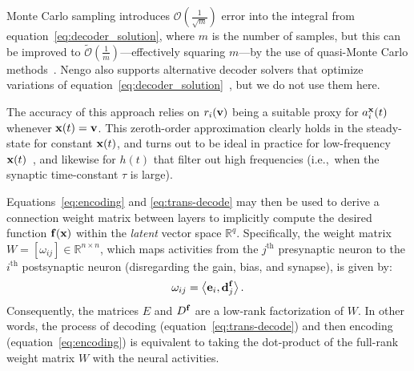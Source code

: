 Monte Carlo sampling introduces $\mathcal{O} \left( \frac{1}{\sqrt{m}} \right)$ error into the integral from equation~\ref{eq:decoder_solution}, where $m$ is the number of samples, but this can be improved to $\widetilde{\mathcal{O}} \left( \frac{1}{m} \right)$---effectively squaring $m$---by the use of quasi-Monte Carlo methods~\citep{fang1994, voelker2016b}.
Nengo also supports alternative decoder solvers that optimize variations of equation~\ref{eq:decoder_solution}~\citep[e.g.,][]{voelker2016a, abrams2017}, but we do not use them here.


The accuracy of this approach relies on $r_i(\mathbf{v})$ being a suitable proxy for $a_i^{\mathbf{x}}(t)$ whenever $\mathbf{x}(t) = \mathbf{v}$.
This zeroth-order approximation clearly holds in the steady-state for constant $\mathbf{x}(t)$, and turns out to be ideal in practice for low-frequency $\mathbf{x}(t)$~\citep[][appendix~F.1]{eliasmith2003neural}, and likewise for $h(t)$ that filter out high frequencies (i.e.,~when the synaptic time-constant $\tau$ is large).

Equations~\ref{eq:encoding} and \ref{eq:trans-decode} may then be used to derive a connection weight matrix between layers to implicitly compute the desired function $\mathbf{f}(\mathbf{x})$ within the \emph{latent} vector space $\mathbb{R}^q$.
Specifically, the weight matrix $W = [\omega_{ij}] \in \mathbb{R}^{n \times n}$, which maps activities from the $j^{\text{th}}$ presynaptic neuron to the $i^{\text{th}}$ postsynaptic neuron (disregarding the gain, bias, and synapse), is given by:
\begin{equation} \label{eq:factored-weights}
\omega_{ij} = \left\langle \V{e}_i, \V{d}^\V{f}_j \right\rangle \text{.} %
\end{equation}
Consequently, the matrices $E$ and $D^{\mathbf{f}}$ are a low-rank factorization of $W$.
In other words, the process of decoding (equation~\ref{eq:trans-decode}) and then encoding (equation~\ref{eq:encoding}) is equivalent to taking the dot-product of the full-rank weight matrix $W$ with the neural activities.

